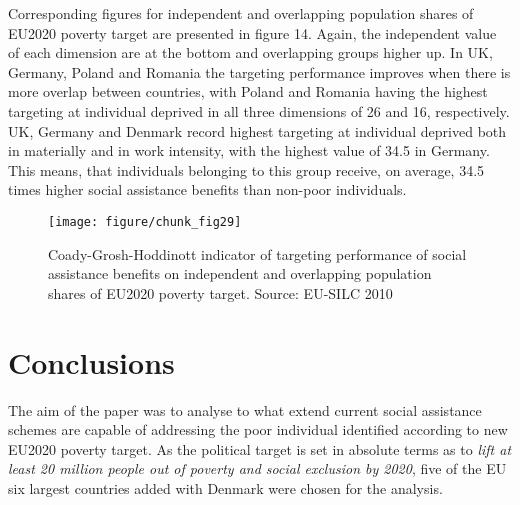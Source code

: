 \documentclass[11pt, a4paper]{article}\usepackage{graphicx, color}
\makeatletter
\def\maxwidth{ %
  \ifdim\Gin@nat@width>\linewidth
    \linewidth
  \else
    \Gin@nat@width
  \fi
}
\newenvironment{knitrout}{}{} %
\makeatother
\begin{document}
Corresponding figures for independent and overlapping population shares of EU2020 poverty target are presented in figure 14. Again, the independent value of each dimension are at the bottom and overlapping groups higher up. In UK, Germany, Poland and Romania the targeting performance improves when there is more overlap between countries, with Poland and Romania having the highest targeting at individual deprived in all three dimensions of 26 and 16, respectively. UK, Germany and Denmark record highest targeting at individual deprived both in materially and in work intensity, with the highest value of 34.5 in Germany. This means, that individuals belonging to this group receive, on average, 34.5 times higher social assistance benefits than non-poor individuals.


\begin{knitrout}
\color{fgcolor}\begin{figure}[H]
\texttt{[image: figure/chunk\_fig29]} \caption[Coady-Grosh-Hoddinott indicator of targeting performance of social assistance benefits on independent and overlapping population shares of EU2020 poverty target]{Coady-Grosh-Hoddinott indicator of targeting performance of social assistance benefits on independent and overlapping population shares of EU2020 poverty target. Source: EU-SILC 2010\label{fig:chunk_fig29}}
\end{figure}

\end{knitrout}




\section{Conclusions}

The aim of the paper was to analyse to what extend current social assistance schemes are capable of addressing the poor individual identified according to new EU2020 poverty target. As the political target is set in absolute terms as to \emph{lift at least 20 million people out of poverty and social exclusion by 2020}, five of the EU six largest countries added with Denmark were chosen for the analysis.
\end{document}
